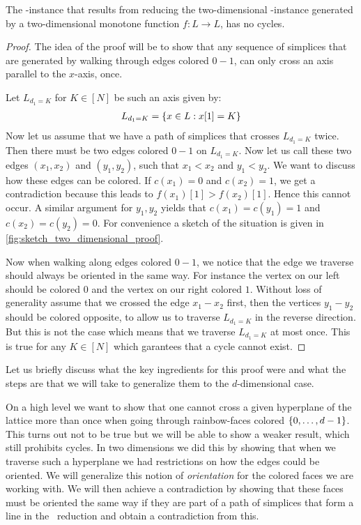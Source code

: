 \begin{proposition}
	The \EndOfLine-instance that results from reducing the two-dimensional \Sperner-instance generated by a two-dimensional monotone function $f : L \rightarrow L$, has no cycles.
\end{proposition}
\begin{proof}
	The idea of the proof will be to show that any sequence of simplices that are generated by walking through edges colored $0 - 1$, can only cross an axis parallel to the $x$-axis, once.

	Let $L_{d_1= K}$ for $K \in [N]$ be such an axis given by:
	\begin{align*}
		L_{d_1=K} = \left\{x \in L : x[1] = K\right\}
	\end{align*}
	Now let us assume that we have a path of simplices that crosses $L_{d_1 = K}$ twice. Then there must be two edges colored $0 - 1$ on $L_{d_1=K}$. Now let us call these two edges $(x_1, x_2)$ and $(y_1, y_2)$, such that $x_1 < x_2$ and $y_1 < y_2$. We want to discuss how these edges can be colored. If $c(x_1) = 0$ and $c(x_2) = 1$, we get a contradiction because this leads to $f(x_1)[1] > f(x_2)[1]$. Hence this cannot occur. A similar argument for $y_1, y_2$ yields that $c(x_1) = c(y_1) =1$ and $c(x_2) = c(y_2) = 0$. For convenience a sketch of the situation is given in \cref{fig:sketch_two_dimensional_proof}.

	Now when walking along edges colored $0 - 1$, we notice that the edge we traverse should always be oriented in the same way. For instance the vertex on our left should be colored $0$ and the vertex on our right colored $1$. Without loss of generality assume that we crossed the edge $x_1 - x_2$ first, then the vertices $y_1 - y_2$ should be colored opposite, to allow us to traverse $L_{d_1=K}$ in the reverse direction. But this is not the case which means that we traverse $L_{d_1=K}$ at most once. This is true for any $K \in [N]$ which garantees that a cycle cannot exist.
\end{proof}
\begin{marginfigure}[-30mm]
	\caption{Sketch of the setting for the two dimensional proof}
	\label{fig:sketch_two_dimensional_proof}
\end{marginfigure}

Let us briefly discuss what the key ingredients for this proof were and what the steps are that we will take to generalize them to the $d$-dimensional case.

On a high level we want to show that one cannot cross a given hyperplane of the lattice more than once when going through rainbow-faces colored $\left\{0, \dots, d-1\right\}$. This turns out not to be true but we will be able to show a weaker result, which still prohibits cycles. In two dimensions we did this by showing that when we traverse such a hyperplane we had restrictions on how the edges could be oriented. We will generalize this notion of  \emph{orientation} for the colored faces we are working with. We will then achieve a contradiction by showing that these faces must be oriented the same way if they are part of a path of simplices that form a line in the \EndOfLine\ reduction and obtain a contradiction from this.

